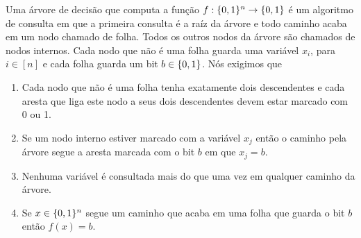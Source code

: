 \begin{defi}  \label{decision_tree_defi}

    Uma árvore de decisão que computa a função $f: \{0, 1\}^{n} \to \{0, 1\}$ é um algoritmo de consulta em que a primeira consulta é a raíz da árvore e todo caminho acaba em um nodo chamado de folha. Todos os outros nodos da árvore são chamados de nodos internos. Cada nodo que não é uma folha guarda uma variável $x_{i}$, para $i \in [n]$ e cada folha guarda um bit $b \in \{0, 1\}$.  Nós exigimos que
    
    \begin{enumerate}
    
        \item Cada nodo que não é uma folha tenha exatamente dois descendentes e cada aresta que liga este nodo a seus dois descendentes devem estar marcado com 0 ou 1.
        
        \item Se um nodo interno estiver marcado com a variável $x_{j}$ então o caminho pela árvore segue a aresta marcada com o bit $b$ em que $x_{j} = b$.
        
        \item Nenhuma variável é consultada mais do que uma vez em qualquer caminho da árvore.
        
        \item Se $x \in \{0, 1\}^{n}$ segue um caminho que acaba em uma folha que guarda o bit $b$ então $f(x) = b$.
        
    
    \end{enumerate}

\end{defi}

\begin{center}
\end{center}

